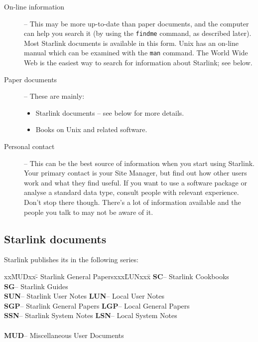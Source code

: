 \documentclass[twoside,11pt,nolof]{starlink}
\begin{document}
\begin{description}

\item [On-line information] --
This may be more up-to-date than paper documents, and the computer can help
you search it (by using the \texttt{findme} command, as described later).
Most Starlink documents is available in this form.
Unix has an on-line manual which can be examined with the \texttt{man} command.
The World Wide Web is the easiest way to search for information about
Starlink; see below.

\item [Paper documents] --
These are mainly:
\begin{itemize}
\item Starlink documents -- see below for more details.
\item Books on Unix and related software.
\end{itemize}

\item [Personal contact] --
This can be the best source of information when you start using Starlink.
Your primary contact is your Site Manager, but find out how other users work
and what they find useful.
If you want to use a software package or analyse a standard data type,
consult people with relevant experience.
Don't stop there though.
There's a lot of information available and the people you talk to may
not be aware of it.
\end{description}

\newpage

\subsection{Starlink documents}

Starlink publishes its
in the following series:

\begin{small}
\begin{tabbing}
xx\=MUDxx\=- Starlink General Papersxxx\=LUNxx\=x\kill
\>\textbf{SC}\>-- Starlink Cookbooks\\
\>\textbf{SG}\>-- Starlink Guides\\
\>\textbf{SUN}\>-- Starlink User Notes     \>\textbf{LUN}\>-- Local User Notes\\
\>\textbf{SGP}\>-- Starlink General Papers \>\textbf{LGP}\>-- Local General Papers\\
\>\textbf{SSN}\>-- Starlink System Notes   \>\textbf{LSN}\>-- Local System Notes\\
\\
\>\textbf{MUD}\>-- Miscellaneous User Documents
\end{tabbing}
\end{small}
\end{document}
